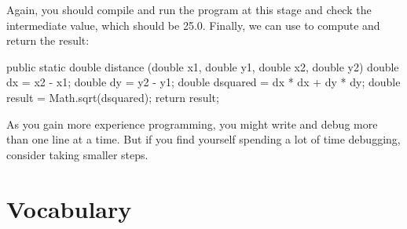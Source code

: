 Again, you should compile and run the program at this stage and check the intermediate value, which should be 25.0.
Finally, we can use  to compute and return the result:

\begin{code}
public static double distance
        (double x1, double y1, double x2, double y2) {
    double dx = x2 - x1;
    double dy = y2 - y1;
    double dsquared = dx * dx + dy * dy;
    double result = Math.sqrt(dsquared);
    return result;
}
\end{code}


As you gain more experience programming, you might write and debug more than one line at a time.
But if you find yourself spending a lot of time debugging, consider taking smaller steps.


\section{Vocabulary}

